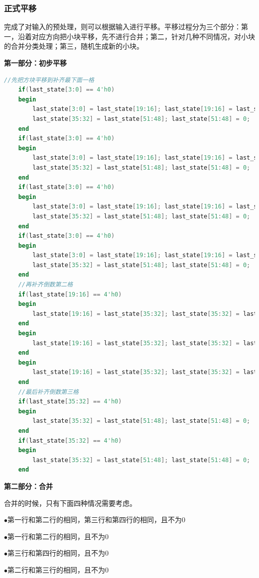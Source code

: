 \documentclass[UTF8]{article}
\newcommand{\keypoint}[1]{$\bullet$\quad#1\par}
\newcommand{\jumpline} {\hspace*{\fill} \par}
\begin{document}
	\subsubsection{正式平移}
	完成了对输入的预处理，则可以根据输入进行平移。平移过程分为三个部分：第一，沿着对应方向把小块平移，先不进行合并；第二，针对几种不同情况，对小块的合并分类处理；第三，随机生成新的小块。\par
	\textbf{第一部分：初步平移}\par
	\begin{lstlisting}[language=Verilog, name=初步平移]
	//先把方块平移到补齐最下面一格
	if(last_state[3:0] == 4'h0) 
	begin 
		last_state[3:0] = last_state[19:16]; last_state[19:16] = last_state[35:32]; 
		last_state[35:32] = last_state[51:48]; last_state[51:48] = 0; 
	end
	if(last_state[3:0] == 4'h0) 
	begin 
		last_state[3:0] = last_state[19:16]; last_state[19:16] = last_state[35:32]; 
		last_state[35:32] = last_state[51:48]; last_state[51:48] = 0; 
	end
	if(last_state[3:0] == 4'h0) 
	begin 
		last_state[3:0] = last_state[19:16]; last_state[19:16] = last_state[35:32]; 
		last_state[35:32] = last_state[51:48]; last_state[51:48] = 0; 
	end
	if(last_state[3:0] == 4'h0) 
	begin 
		last_state[3:0] = last_state[19:16]; last_state[19:16] = last_state[35:32]; 
		last_state[35:32] = last_state[51:48]; last_state[51:48] = 0; 
	end
	//再补齐倒数第二格
	if(last_state[19:16] == 4'h0) 
	begin 
		last_state[19:16] = last_state[35:32]; last_state[35:32] = last_state[51:48]; last_state[51:48] = 0; 
	end
	begin 
		last_state[19:16] = last_state[35:32]; last_state[35:32] = last_state[51:48]; last_state[51:48] = 0; 
	end
	begin 
		last_state[19:16] = last_state[35:32]; last_state[35:32] = last_state[51:48]; last_state[51:48] = 0; 
	end
	//最后补齐倒数第三格
	if(last_state[35:32] == 4'h0) 
	begin 
		last_state[35:32] = last_state[51:48]; last_state[51:48] = 0; 
	end
	if(last_state[35:32] == 4'h0) 
	begin 
		last_state[35:32] = last_state[51:48]; last_state[51:48] = 0; 
	end
	\end{lstlisting}\par
	\jumpline
	\textbf{第二部分：合并}\par
	合并的时候，只有下面四种情况需要考虑。\par
	\keypoint{第一行和第二行的相同，第三行和第四行的相同，且不为0}
	\keypoint{第一行和第二行的相同，且不为0}
	\keypoint{第三行和第四行的相同，且不为0}
	\keypoint{第二行和第三行的相同，且不为0}
\end{document}
